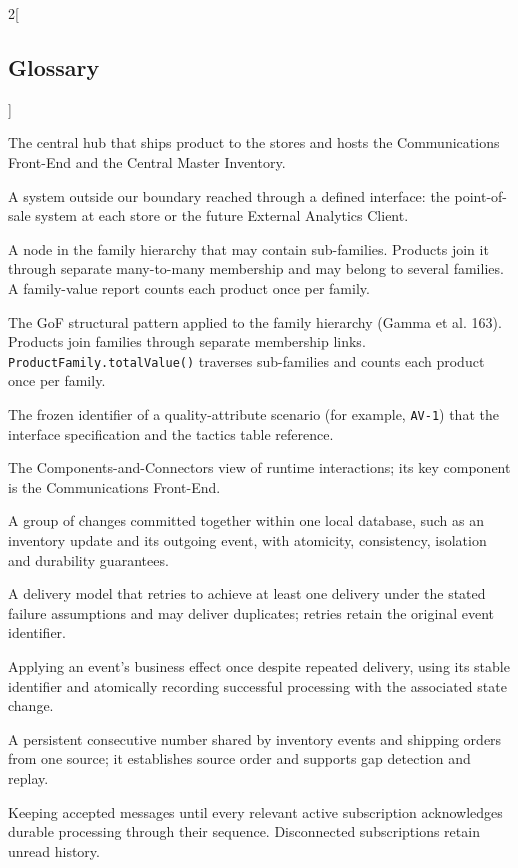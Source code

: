 \begin{multicols}{2}[\subsection{Glossary}\label{sec:glossary}]
\begin{description}[style=unboxed,leftmargin=1em,labelindent=0pt,itemsep=0.5pt,parsep=0pt]
\item[Distribution Center (DC)] The central hub that ships product to the stores and hosts the Communications Front-End and the Central Master Inventory.
\item[External system] A system outside our boundary reached through a defined interface: the point-of-sale system at each store or the future External Analytics Client.
\begin{samepage}
\item[Product family] A node in the family hierarchy that may contain sub-families. Products join it through separate many-to-many membership and may belong to several families. A family-value report counts each product once per family.\par
\end{samepage}
\item[Composite] The GoF structural pattern applied to the family hierarchy (Gamma et al. 163). Products join families through separate membership links. \texttt{ProductFamily.totalValue()} traverses sub-families and counts each product once per family.
\item[Scenario ID] The frozen identifier of a quality-attribute scenario (for example, \texttt{AV-1}) that the interface specification and the tactics table reference.
\item[Key view] The Components-and-Connectors view of runtime interactions; its key component is the Communications Front-End.
\item[Local transaction] A group of changes committed together within one local database, such as an inventory update and its outgoing event, with atomicity, consistency, isolation and durability guarantees.
\item[At-least-once delivery] A delivery model that retries to achieve at least one delivery under the stated failure assumptions and may deliver duplicates; retries retain the original event identifier.
\item[Idempotent processing] Applying an event's business effect once despite repeated delivery, using its stable identifier and atomically recording successful processing with the associated state change.
\item[Per-source sequence] A persistent consecutive number shared by inventory events and shipping orders from one source; it establishes source order and supports gap detection and replay.
\item[Event retention] Keeping accepted messages until every relevant active subscription acknowledges durable processing through their sequence. Disconnected subscriptions retain unread history.

\end{description}
\end{multicols}
